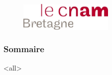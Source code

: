 \institute[\uinstituteshort]{\uinstitute \\ \uchaire}


\date[\uversion]{Date de publication\\ \today}



\begin{frame}[plain]

 					\begin{figure}
  					 \centering
   						 \includegraphics[width=0.4\textwidth]{../Tex/template.inc/Commons/CommonsPictures/cnambretagne.pdf}\\
				  \end{figure}

				  				\titlepage
\end{frame}
\begin{frame}
 \frametitle{Sommaire}
      \begin{multicols}{2}
         \tableofcontents[hideallsubsections]
     \end{multicols}
 \end{frame}


 
\mode<all>{\ubody}



